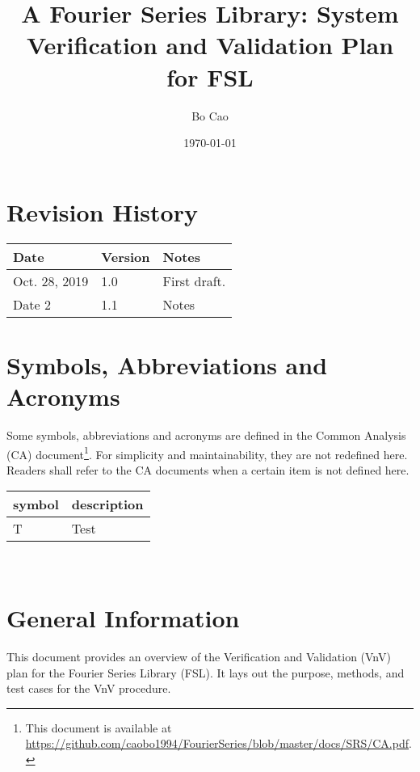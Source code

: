 \documentclass[12pt, titlepage]{article}
\begin{document}
\title{A Fourier Series Library: System Verification and Validation Plan for FSL} 
\author{Bo Cao}
\date{\today}
	
\maketitle


\section{Revision History}

\begin{tabularx}{\textwidth}{p{3cm}p{2cm}X}
\toprule {\bf Date} & {\bf Version} & {\bf Notes}\\
\midrule
Oct. 28, 2019  & 1.0 & First draft.\\
Date 2 & 1.1 & Notes\\
\bottomrule
\end{tabularx}

\newpage

\tableofcontents

\newpage

\section{Symbols, Abbreviations and Acronyms}

Some symbols, abbreviations and acronyms are defined in the Common Analysis (CA)
document\footnote{This document is available at
\url{https://github.com/caobo1994/FourierSeries/blob/master/docs/SRS/CA.pdf}.}. For
simplicity and maintainability, they are not redefined here. Readers shall refer
to the CA documents when a certain item is not defined here.

\vspace{1cm}

\renewcommand{\arraystretch}{1.2}
\begin{tabular}{l l} 
  \toprule		
  \textbf{symbol} & \textbf{description}\\
  \midrule 
  T & Test\\
  \bottomrule
\end{tabular}\\

\newpage



\section{General Information} This document provides an overview of the
Verification and Validation (VnV) plan for the Fourier Series Library (FSL). It
lays out the purpose, methods, and test cases for the VnV procedure.
\end{document}
